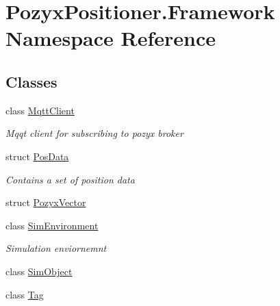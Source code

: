 \hypertarget{namespace_pozyx_positioner_1_1_framework}{}\section{Pozyx\+Positioner.\+Framework Namespace Reference}
\label{namespace_pozyx_positioner_1_1_framework}
\subsection*{Classes}
\begin{DoxyCompactItemize}
\item 
class \hyperlink{class_pozyx_positioner_1_1_framework_1_1_mqtt_client}{Mqtt\+Client}
\begin{DoxyCompactList}\small\item\em Mqqt client for subscribing to pozyx broker \end{DoxyCompactList}\item 
struct \hyperlink{struct_pozyx_positioner_1_1_framework_1_1_pos_data}{Pos\+Data}
\begin{DoxyCompactList}\small\item\em Contains a set of position data \end{DoxyCompactList}\item 
struct \hyperlink{struct_pozyx_positioner_1_1_framework_1_1_pozyx_vector}{Pozyx\+Vector}
\item 
class \hyperlink{class_pozyx_positioner_1_1_framework_1_1_sim_environment}{Sim\+Environment}
\begin{DoxyCompactList}\small\item\em Simulation enviornemnt \end{DoxyCompactList}\item 
class \hyperlink{class_pozyx_positioner_1_1_framework_1_1_sim_object}{Sim\+Object}
\item 
class \hyperlink{class_pozyx_positioner_1_1_framework_1_1_tag}{Tag}
\end{DoxyCompactItemize}

